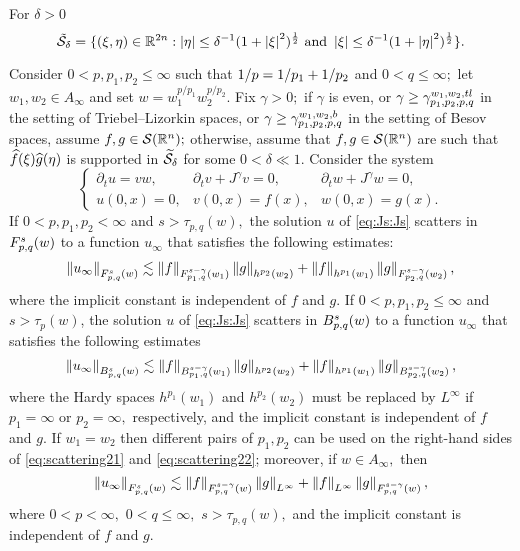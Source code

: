 For $\delta >0$ 
\[ \tilde{\Ss}_{\delta}=\{(\xi,\eta)\in \re^{2n}: \abs{\eta}\le \delta^{-1}(1+\abs{\xi}^2)^\frac{1}{2} \text{ and }\abs{\xi}\le \delta^{-1}(1+\abs{\eta}^2)^\frac{1}{2}\}.\]



\begin{theorem}\label{thm:scattering2} Consider  $0 < p, p_1, p_2  \le \infty$  such that $\hcline$ and  $0 < q \leq \infty;$ let  $w_1,w_2\in A_\infty$ and set $w=w_1^{{p}/{p_1}} w_2^{{p}/{p_2}}.$ Fix $\gamma>0;$ if $\gamma$ is even, or $\gamma\ge \gamt$ in the setting of Triebel--Lizorkin spaces, or $\gamma\ge \gamb$ in the setting of Besov spaces, assume $f, g \in \sw;$ otherwise, assume that $f,g\in\sw$ are such that $\fhat(\xi)\ghat(\eta)$ is supported in $\widetilde{\Ss}_{\delta}$ for some $0<\delta\ll1.$ Consider the system 
\begin{equation}\label{eq:Js:Js}
\left\{ \begin{array}{lll}  \partial_t u =vw, & \partial_t v +J^\gamma v = 0, & \partial_t w + J^\gamma w = 0, \\
  u(0,x)=0,&v(0,x)=f(x),&w(0,x) = g(x).
 \end{array} \right.
\end{equation}
If $0 < p,p_1,p_2 < \infty$ and  $s > \tau_{p,q}(w),$ the solution $u$ of \eqref{eq:Js:Js}  scatters in $\itlw{p}{s}{q}{w}$ to a function $u_\infty$ that satisfies the following estimates: 
\begin{equation}\label{eq:scattering21}
\norm{u_\infty}{\itlw{p}{s}{q}{w}} \lesssim \norm{f}{\itlw{p_1}{s-\gamma}{q}{w_1} } \norm{g}{h^{p_2}(w_2)} +  \norm{f}{h^{p_1}(w_1)}   \norm{g}{\itlw{p_2}{s-\gamma}{q}{w_2} },
\end{equation}
where the implicit constant is independent of $f$ and $g.$  
If $0< p, p_1,p_2\leq \infty$ and $s > \tau_p(w)$, the solution $u$ of \eqref{eq:Js:Js}  scatters in $\ibesw{p}{s}{q}{w}$ to a function $u_\infty$ that satisfies the following estimates
\begin{equation}\label{eq:scattering22}
\norm{u_\infty}{\ibesw{p}{s}{q}{w}} \lesssim \norm{f}{\ibesw{p_1}{s-\gamma}{q}{w_1} } \norm{g}{h^{p_2}(w_2)} +  \norm{f}{h^{p_1}(w_1)}   \norm{g}{\ibesw{p_2}{s-\gamma}{q}{w_2} },
\end{equation}
where the Hardy spaces $h^{p_1}(w_1)$ and $h^{p_2}(w_2)$ must be replaced by $L^\infty$ if $p_1=\infty$ or $p_2=\infty,$ respectively, and the implicit constant is independent of $f$ and $g.$  
If $w_1=w_2$ then different pairs of $p_1, p_2$ can be used on the right-hand sides of \eqref{eq:scattering21} and \eqref{eq:scattering22}; moreover, if $w\in A_\infty,$ then 
\begin{equation*}
\norm{u_\infty}{\itlw{p}{s}{q}{w}} \lesssim \norm{f}{\itlw{p}{s-\gamma}{q}{w} } \norm{g}{L^\infty} +  \norm{f}{L^\infty}   \norm{g}{\itlw{p}{s-\gamma}{q}{w}},
\end{equation*}
where $0<p<\infty,$ $0<q\le\infty,$  $s>\tau_{p,q}(w),$ and the implicit constant is independent of $f$ and $g.$  
\end{theorem}  
 
